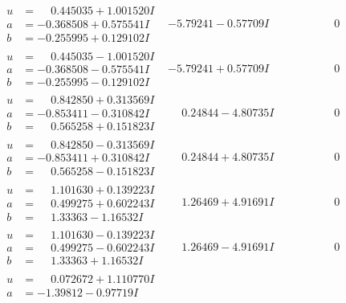 \documentclass[1p]{elsarticle_modified}
\theoremstyle{definition}
\begin{document}
$$\begin{array}{c|c|c}
 \hline 
\begin{aligned}
u &= \phantom{-}0.445035 + 1.001520 I \\
a &= -0.368508 + 0.575541 I \\
b &= -0.255995 + 0.129102 I\end{aligned}
 & -5.79241 - 0.57709 I & \phantom{-0.000000 } 0 \\ \hline\begin{aligned}
u &= \phantom{-}0.445035 - 1.001520 I \\
a &= -0.368508 - 0.575541 I \\
b &= -0.255995 - 0.129102 I\end{aligned}
 & -5.79241 + 0.57709 I & \phantom{-0.000000 } 0 \\ \hline\begin{aligned}
u &= \phantom{-}0.842850 + 0.313569 I \\
a &= -0.853411 - 0.310842 I \\
b &= \phantom{-}0.565258 + 0.151823 I\end{aligned}
 & \phantom{-}0.24844 - 4.80735 I & \phantom{-0.000000 } 0 \\ \hline\begin{aligned}
u &= \phantom{-}0.842850 - 0.313569 I \\
a &= -0.853411 + 0.310842 I \\
b &= \phantom{-}0.565258 - 0.151823 I\end{aligned}
 & \phantom{-}0.24844 + 4.80735 I & \phantom{-0.000000 } 0 \\ \hline\begin{aligned}
u &= \phantom{-}1.101630 + 0.139223 I \\
a &= \phantom{-}0.499275 + 0.602243 I \\
b &= \phantom{-}1.33363 - 1.16532 I\end{aligned}
 & \phantom{-}1.26469 + 4.91691 I & \phantom{-0.000000 } 0 \\ \hline\begin{aligned}
u &= \phantom{-}1.101630 - 0.139223 I \\
a &= \phantom{-}0.499275 - 0.602243 I \\
b &= \phantom{-}1.33363 + 1.16532 I\end{aligned}
 & \phantom{-}1.26469 - 4.91691 I & \phantom{-0.000000 } 0 \\ \hline\begin{aligned}
u &= \phantom{-}0.072672 + 1.110770 I \\
a &= -1.39812 - 0.97719 I \\

\end{aligned}
\end{array}$$
\end{document}

